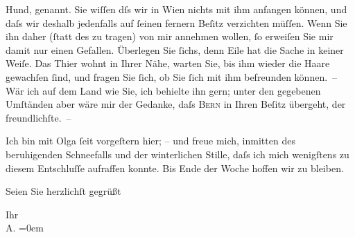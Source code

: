               Hund, \textsc{\label{K_L01265-1v}\label{K_L01265-1}} genannt. Sie wiſſen dſs wir in Wien nichts
               mit ihm anfangen können, und daſs wir deshalb jedenfalls auf ſeinen fernern Beſitz
               verzichten {\pb}müſſen. Wenn Sie ihn daher (ſtatt des
               \label{K_L01265-2v}\label{K_L01265-2} zu tragen) von mir annehmen wollen, ſo erweiſen Sie
               mir damit nur einen Gefallen. Überlegen Sie ſichs, denn Eile hat die Sache in keiner
               Weiſe. Das Thier wohnt in Ihrer Nähe, warten Sie, bis ihm wieder {\pb}die Haare gewachſen ſind, und fragen Sie ſich, ob Sie
               ſich mit ihm befreunden können. – Wär ich auf dem Land wie Sie, ich behielte ihn
               gern; unter den gegebenen Umſtänden aber wäre mir der Gedanke, daſs \textsc{Bern} in Ihren Beſitz übergeht, der freundlichſte. –\pend
           
\pstart
           {\pb}Ich bin mit Olga ſeit vorgeſtern hier; – und freue mich, inmitten des beruhigenden
               Schneefalls und der winterlichen Stille, daſs ich mich wenigſtens zu diesem
               Entschluſſe aufraffen konnte. Bis Ende der Woche hoffen wir zu bleiben.\pend
           
\pstart
           Seien Sie herzlichſt gegrüßt\pend
           
\pstart
           Ihr{\\[\baselineskip]}\spacefill\mbox{A.}\pend
           \leftskip=0em{}\endnumbering{}  
      
